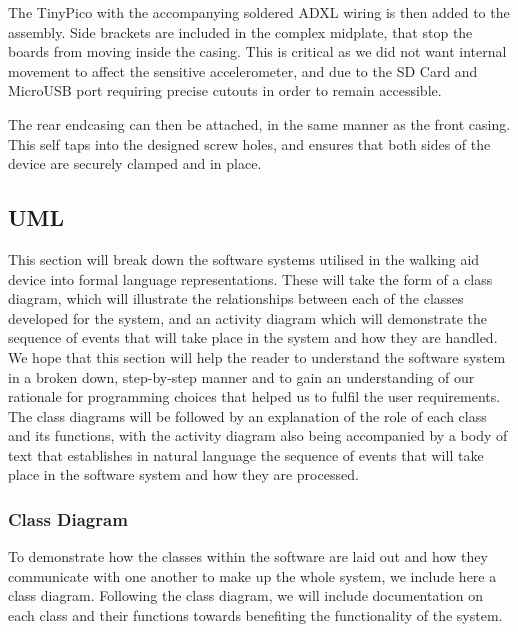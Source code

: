                     The TinyPico with the accompanying soldered ADXL wiring is then added to the assembly. Side brackets are included in the complex midplate, that stop the boards from moving inside the casing. This is critical as we did not want internal movement to affect the sensitive accelerometer, and due to the SD Card and MicroUSB port requiring precise cutouts in order to remain accessible.
        
                    
        
                    The rear endcasing can then be attached, in the same manner as the front casing. This self taps into the designed screw holes, and ensures that both sides of the device are securely clamped and in place.
        
        
                \subsection{UML}
                \label{sec:uml_walk_aid}
                
                    This section will break down the software systems utilised in the walking aid device into formal language representations. These will take the form of a class diagram, which will illustrate the relationships between each of the classes developed for the system, and an activity diagram which will demonstrate the sequence of events that will take place in the system and how they are handled. We hope that this section will help the reader to understand the software system in a broken down, step-by-step manner and to gain an understanding of our rationale for programming choices that helped us to fulfil the user requirements. The class diagrams will be followed by an explanation of the role of each class and its functions, with the activity diagram also being accompanied by a body of text that establishes in natural language the sequence of events that will take place in the software system and how they are processed.
        
                    \subsubsection{Class Diagram}
                    \label{subsubsec:class_diagram_walking_aid}
        
                        To demonstrate how the classes within the software are laid out and how they communicate with one another to make up the whole system, we include here a class diagram. Following the class diagram, we will include documentation on each class and their functions towards benefiting the functionality of the system. 
        
